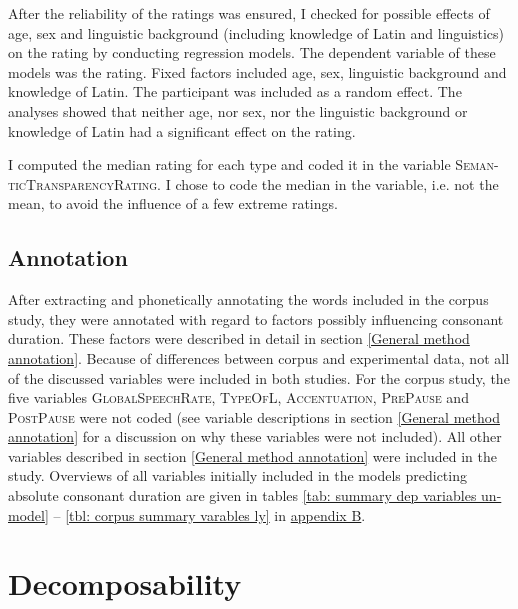 After the reliability of the ratings was ensured, I checked for possible effects of age, sex and linguistic background (including knowledge of Latin and linguistics) on the rating by conducting regression models. The dependent variable of these models was the rating. Fixed factors included age, sex, linguistic background and knowledge of Latin. The participant was included as a random effect. The analyses showed that neither age, nor sex,  nor the linguistic background or knowledge of Latin had a significant effect on the rating.

I computed the median rating for each type and coded it in the variable \textsc{Seman-ticTransparencyRating}. I chose to code the median in the variable, i.e. not the mean, to avoid the influence of a few extreme ratings. 






\subsection{Annotation} \label{Overview of the Variables in the Data Set corpus}

After extracting and phonetically annotating the words included in the corpus study, they were annotated with regard to factors possibly influencing consonant duration. These factors were described in detail in section \ref{General method annotation}. Because of differences between corpus and experimental data, not all of the discussed variables were included in both studies. For the corpus study, the five variables \textsc{GlobalSpeechRate}, \textsc{TypeOfL}, \textsc{Accentuation}, \textsc{PrePause} and \textsc{PostPause} were not coded (see variable descriptions in section \ref{General method annotation} for a discussion on why these variables were not included). 
All other variables described in section \ref{General method annotation} were included in the study. 
Overviews of all variables initially included in the models predicting absolute consonant duration are given in tables \ref{tab: summary dep variables un-model} -- \ref{tbl: corpus summary varables ly} in \hyperref[App B: Summaries of variables in initial models of corpus study]{appendix B}. 




\section{Decomposability} \label{corpus dec}

